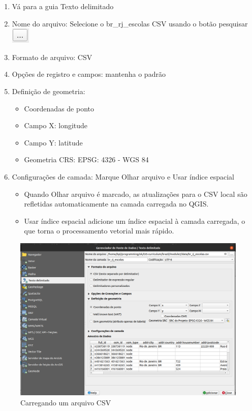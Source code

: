 \documentclass[
]{book}
\providecommand{\tightlist}{%
  \setlength{\itemsep}{0pt}\setlength{\parskip}{0pt}}
\begin{document}
\begin{enumerate}
\begin{enumerate}
    \begin{enumerate}
    \def\labelenumiii{\arabic{enumiii}.}
    \item
      Vá para a guia Texto delimitado
    \item
      Nome do arquivo: Selecione o br\_rj\_escolas CSV usando o botão pesquisar \includegraphics{media/modulo2/data-source-manager-search.png}
    \item
      Formato de arquivo: CSV
    \item
      Opções de registro e campos: mantenha o padrão
    \item
      Definição de geometria:

      \begin{itemize}
      \tightlist
      \item
        Coordenadas de ponto
      \item
        Campo X: longitude
      \item
        Campo Y: latitude
      \item
        Geometria CRS: EPSG: 4326 - WGS 84
      \end{itemize}
    \item
      Configurações de camada: Marque Olhar arquivo e Usar índice espacial

      \begin{itemize}
      \tightlist
      \item
        Quando Olhar arquivo é marcado, as atualizações para o CSV local são refletidas automaticamente na camada carregada no QGIS.
      \item
        Usar índice espacial adicione um índice espacial à camada carregada, o que torna o processamento vetorial mais rápido.
      \end{itemize}
    \end{enumerate}
  \end{enumerate}
\end{enumerate}

\begin{figure}
\centering
\includegraphics{media/modulo2/data-source-manager-csv.png}
\caption{Carregando um arquivo CSV}
\end{figure}
\end{document}
